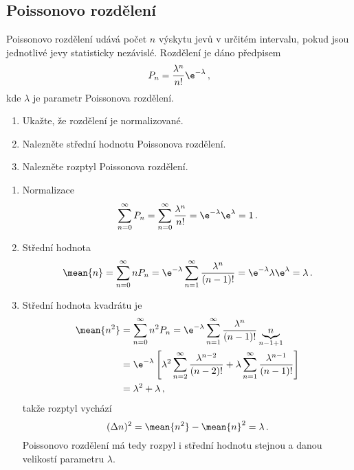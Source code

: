 \subsection{Poissonovo rozdělení}
\label{sec:PoissonDistribution}
Poissonovo rozdělení udává počet $n$ výskytu jevů v určitém intervalu, pokud jsou jednotlivé jevy statisticky nezávislé.
Rozdělení je dáno předpisem
\begin{equation}
    \label{eq:PoissonDistribution}
    P_{n}=\frac{\lambda^{n}}{n!}\e^{-\lambda}\,,
\end{equation}			
kde $\lambda$ je parametr Poissonova rozdělení.

\begin{enumerate}
\item
    Ukažte, že rozdělení je normalizované.
    
\item
    Nalezněte střední hodnotu Poissonova rozdělení.
    
\item
    Nalezněte rozptyl Poissonova rozdělení.
\end{enumerate}

\begin{solution}
    \begin{enumerate}
	\item
		Normalizace
		\begin{equation}
			\sum_{n=0}^{\infty}P_{n}
				=\sum_{n=0}^{\infty}\frac{\lambda^{n}}{n!}
				=\e^{-\lambda}\e^{\lambda}=1\,.
		\end{equation}
		
	\item
		Střední hodnota
		\begin{equation}
			\mean{n}
				=\sum_{n=0}^{\infty}nP_{n}
				=\e^{-\lambda}\sum_{n=1}^{\infty}\frac{\lambda^{n}}{(n-1)!}
				=\e^{-\lambda}\lambda\e^{\lambda}=\lambda\,.
		\end{equation}
		
	\item
		Střední hodnota kvadrátu je
		\begin{align}
			\mean{n^{2}}
				&=\sum_{n=0}^{\infty}n^{2}P_{n}
				=\e^{-\lambda}\sum_{n=1}^{\infty}\frac{\lambda^{n}}{(n-1)!}
					\underbrace{n}_{n-1+1}\nonumber\\
				&=\e^{-\lambda}\left[\lambda^{2}\sum_{n=2}^{\infty}\frac{\lambda^{n-2}}{(n-2)!}
					+\lambda\sum_{n=1}^{\infty}\frac{\lambda^{n-1}}{(n-1)!}\right]\nonumber\\
				&=\lambda^{2}+\lambda\,,
		\end{align}
		takže rozptyl vychází
		\begin{equation}
			(\Delta n)^{2}=\mean{n^{2}}-\mean{n}^{2}=\lambda\,.
		\end{equation}
		Poissonovo rozdělení má tedy rozpyl i střední hodnotu stejnou a danou velikostí parametru $\lambda$.
	\end{enumerate}
\end{solution}
